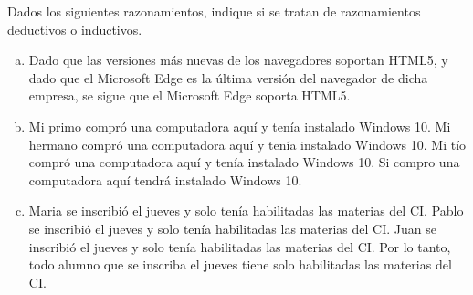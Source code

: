 \begin{exercise}
    Dados los siguientes razonamientos, indique si se tratan de razonamientos
    deductivos o inductivos.

    \begin{enumerate}[a)]
      \item
        Dado que las versiones más nuevas de los navegadores soportan HTML5,
        y dado que el Microsoft Edge es la última versión del navegador de dicha
        empresa, se sigue que el Microsoft Edge soporta HTML5.

      \item
        Mi primo compró una computadora aquí y tenía instalado Windows 10.
        Mi hermano compró una computadora aquí y tenía instalado Windows 10.
        Mi tío compró una computadora aquí y tenía instalado Windows 10.
        Si compro una computadora aquí tendrá instalado Windows 10.

      \item
        Maria se inscribió el jueves y solo tenía habilitadas las materias del CI.
        Pablo se inscribió el jueves y solo tenía habilitadas las materias del CI.
        Juan se inscribió el jueves y solo tenía habilitadas las materias del CI.
        Por lo tanto, todo alumno que se inscriba el jueves tiene solo habilitadas las materias del CI.
    \end{enumerate}
\end{exercise}

